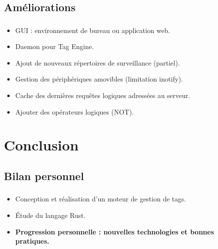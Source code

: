 \documentclass[10pt]{beamer}
\begin{document}
\subsection{Améliorations}
\begin{frame}
    \frametitle{\subsecname}
    \begin{itemize}
        \pause
        \item GUI : environnement de bureau ou application web.
        \pause
        \item Daemon pour Tag Engine.
        \pause
        \item Ajout de nouveaux répertoires de surveillance (partiel).
        \pause
        \item Gestion des périphériques amovibles (limitation inotify).
        \pause
        \item Cache des dernières requêtes logiques adressées au serveur.
        \pause
        \item Ajouter des opérateurs logiques (NOT).
    \end{itemize}
\end{frame}

\section{Conclusion}
\subsection{Bilan personnel}
\begin{frame}
    \frametitle{\subsecname}
    \begin{itemize}
        \pause
        \item Conception et réalisation d'un moteur de gestion de tags.
        \pause
        \item Étude du langage Rust.
        \pause
        \item \textbf{Progression personnelle : nouvelles technologies et bonnes pratiques.}
    \end{itemize}
\end{frame}

\end{document}
